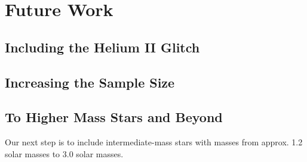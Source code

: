 \chapter{Future Work}\label{ch:future}

\section{Including the Helium II Glitch}

\section{Increasing the Sample Size}

\section{To Higher Mass Stars and Beyond}

Our next step is to include intermediate-mass stars with masses from approx. 1.2 solar masses to 3.0 solar masses.
